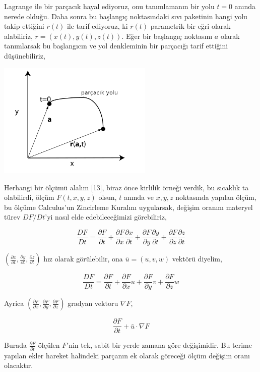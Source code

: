 \documentclass[12pt,fleqn]{article}\usepackage{../../common}
\begin{document}
Lagrange ile bir parçacık hayal ediyoruz, onu tanımlamanın bir yolu $t=0$ anında
nerede olduğu. Daha sonra bu başlangıç noktasındaki sıvı paketinin hangi yolu
takip ettiğini $\bar{r}(t)$ ile tarif ediyoruz, ki $\bar{r}(t)$ parametrik bir
eğri olarak alabiliriz, $r = ( x(t), y(t), z(t) )$. Eğer bir başlangıç
noktasını $a$ olarak tanımlarsak bu başlangıcın ve yol denkleminin bir parçacığı
tarif ettiğini düşünebiliriz,

\includegraphics[width=20em]{phy_050_cons_02.png}

Herhangi bir ölçümü alalım [13], biraz önce kirlilik örneği verdik, bu
sıcaklık ta olabilirdi, ölçüm $F(t,x,y,z)$ olsun, $t$ anında ve $x,y,z$
noktasında yapılan ölçüm, bu ölçüme Calculus'un Zincirleme Kuralını uygularsak,
değişim oranını materyel türev $D F / Dt$'yi nasıl elde edebileceğimizi
görebiliriz,

$$
\frac{D F}{D t} =
\frac{\partial F}{\partial t} +
\frac{\partial F}{\partial x} \frac{\partial x}{\partial t} + 
\frac{\partial F}{\partial y} \frac{\partial y}{\partial t} + 
\frac{\partial F}{\partial z} \frac{\partial z}{\partial t} 
$$

$(\frac{\partial x}{\partial t}, \frac{\partial y}{\partial t},\frac{\partial
z}{\partial t})$ hız olarak görülebilir, ona $\bar{u} = (u,v,w)$ vektörü diyelim,

$$
\frac{D F}{D t} =
\frac{\partial F}{\partial t} +
\frac{\partial F}{\partial x} u + 
\frac{\partial F}{\partial y} v + 
\frac{\partial F}{\partial z} w 
$$

Ayrica $(\frac{\partial F}{\partial x},\frac{\partial F}{\partial y},\frac{\partial F}{\partial z})$
gradyan vektoru $\nabla F$,

$$
\frac{\partial F}{\partial t} + \bar{u} \cdot \nabla F
$$

Burada $\frac{\partial F}{\partial t}$ ölçülen $F$'nin tek, sabit bir yerde
zamana göre değişimidir. Bu terime yapılan ekler hareket halindeki parçanın ek
olarak göreceği ölçüm değişim oranı olacaktır.
\end{document}
